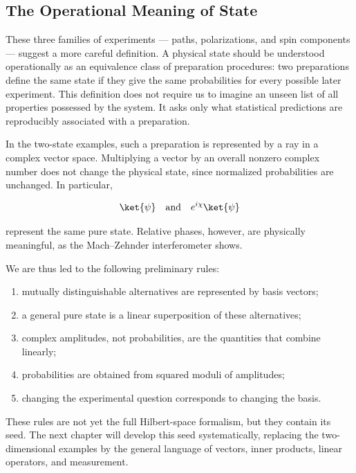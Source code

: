\subsection{The Operational Meaning of State}
\label{subsec:operational-state}
These three families of experiments --- paths, polarizations, and spin components --- suggest a more careful definition. A physical state should be understood operationally as an equivalence class of preparation procedures: two preparations define the same state if they give the same probabilities for every possible later experiment. This definition does not require us to imagine an unseen list of all properties possessed by the system. It asks only what statistical predictions are reproducibly associated with a preparation.

In the two-state examples, such a preparation is represented by a ray in a complex vector space. Multiplying a vector by an overall nonzero complex number does not change the physical state, since normalized probabilities are unchanged. In particular,
\begin{linenomath}
    \begin{equation}
        \ket{\psi}
        \quad\text{and}\quad
        e^{i\chi}\ket{\psi}
    \end{equation}
\end{linenomath}
represent the same pure state. Relative phases, however, are physically meaningful, as the Mach--Zehnder interferometer shows.

We are thus led to the following preliminary rules:
\begin{enumerate}
    \item mutually distinguishable alternatives are represented by basis vectors;
    \item a general pure state is a linear superposition of these alternatives;
    \item complex amplitudes, not probabilities, are the quantities that combine linearly;
    \item probabilities are obtained from squared moduli of amplitudes;
    \item changing the experimental question corresponds to changing the basis.
\end{enumerate}
These rules are not yet the full Hilbert-space formalism, but they contain its seed. The next chapter will develop this seed systematically, replacing the two-dimensional examples by the general language of vectors, inner products, linear operators, and measurement.
